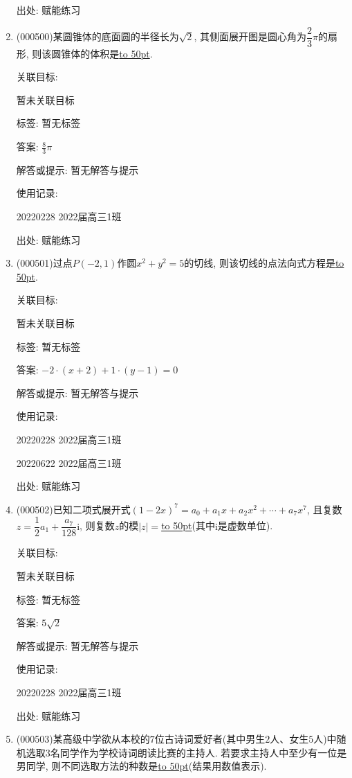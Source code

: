 \documentclass[10pt,a4paper]{article}
\newcommand{\blank}[1]{\underline{\hbox to #1pt{}}}
\begin{document}
\begin{enumerate}[1.]
出处: 赋能练习
\item { (000500)}某圆锥体的底面圆的半径长为$\sqrt2$, 其侧面展开图是圆心角为$\dfrac23\pi$的扇形, 则该圆锥体的体积是\blank{50}.


关联目标:

暂未关联目标



标签: 暂无标签

答案: $\frac 83\pi$

解答或提示: 暂无解答与提示

使用记录:

20220228	2022届高三1班	


出处: 赋能练习
\item { (000501)}过点$P(-2,1)$作圆$x^2+y^2=5$的切线, 则该切线的点法向式方程是\blank{50}.


关联目标:

暂未关联目标



标签: 暂无标签

答案: $-2\cdot (x+2)+1\cdot (y-1)=0$

解答或提示: 暂无解答与提示

使用记录:

20220228	2022届高三1班	

20220622	2022届高三1班  	


出处: 赋能练习
\item { (000502)}已知二项式展开式$(1-2x)^7=a_0+a_1x+a_2x^2+\cdots +a_7x^7$, 且复数$z=\dfrac12a_1+\dfrac{a_7}{128}\mathrm{i}$, 则复数$z$的模$|z|=$\blank{50}(其中$\mathrm{i}$是虚数单位).


关联目标:

暂未关联目标



标签: 暂无标签

答案: $5\sqrt 2$

解答或提示: 暂无解答与提示

使用记录:

20220228	2022届高三1班	


出处: 赋能练习
\item { (000503)}某高级中学欲从本校的$7$位古诗词爱好者(其中男生$2$人、女生$5$人)中随机选取$3$名同学作为学校诗词朗读比赛的主持人. 若要求主持人中至少有一位是男同学, 则不同选取方法的种数是\blank{50}(结果用数值表示).



\end{enumerate}
\end{document}
